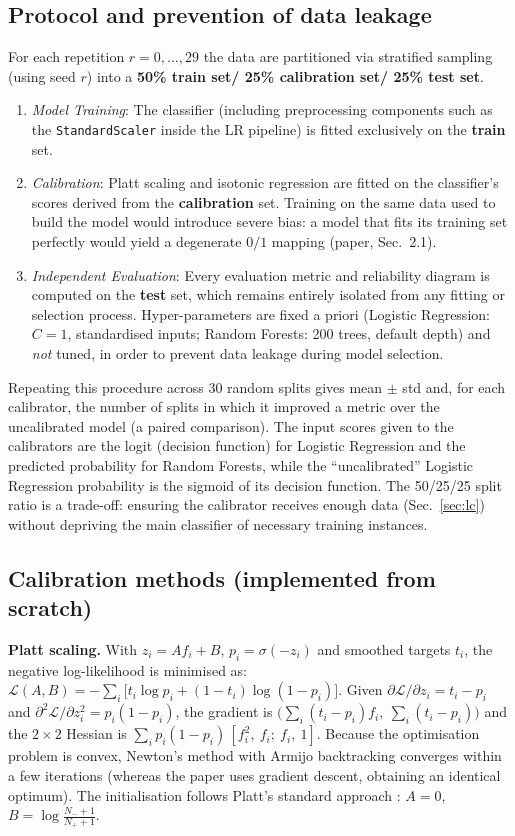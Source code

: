\documentclass[11pt,a4paper]{article}
\begin{document}
\subsection{Protocol and prevention of data leakage}
For each repetition $r=0,\dots,29$ the data are partitioned via stratified sampling (using seed $r$) into a \textbf{50\% train set/ 25\% calibration set/  25\% test set}.
\begin{enumerate}\setlength\itemsep{0pt}
\item \textit{Model Training}: The classifier (including preprocessing components such as the \texttt{StandardScaler} inside the LR pipeline) is fitted exclusively on the \textbf{train} set.
\item \textit{Calibration}: Platt scaling and isotonic regression are fitted on the classifier's scores derived from the \textbf{calibration} set. Training on the same data used to build the model would introduce severe bias: a model that fits its training set perfectly would yield a degenerate $0/1$ mapping (paper, Sec.~2.1).
\item \textit{Independent Evaluation}: Every evaluation metric and reliability diagram is computed on the \textbf{test} set, which remains entirely isolated from any fitting or selection process. Hyper-parameters are fixed a priori (Logistic Regression: $C{=}1$, standardised inputs; Random Forests: 200 trees, default depth) and \emph{not} tuned, in order to prevent data leakage during model selection.
\end{enumerate}
Repeating this procedure across 30 random splits gives mean $\pm$ std and, for each calibrator, the number of splits in which it improved a metric over the uncalibrated model (a paired comparison). The input scores given to the calibrators are the logit (decision function) for Logistic Regression and the predicted probability for Random Forests, while the ``uncalibrated'' Logistic Regression probability is the sigmoid of its decision function. The 50/25/25 split ratio is a trade-off: ensuring the calibrator receives enough data (Sec.~\ref{sec:lc}) without depriving the main classifier of necessary training instances.

\subsection{Calibration methods (implemented from scratch)}
\textbf{Platt scaling.} With $z_i=Af_i+B$, $p_i=\sigma(-z_i)$ and smoothed targets $t_i$, the negative log-likelihood is minimised as:
$\mathcal L(A,B)=-\sum_i \big[t_i\log p_i+(1-t_i)\log(1-p_i)\big]$.
Given $\partial\mathcal L/\partial z_i = t_i-p_i$ and $\partial^2\mathcal L/\partial z_i^2=p_i(1-p_i)$, the gradient is $\big(\sum_i (t_i-p_i)f_i,\ \sum_i (t_i-p_i)\big)$ and the $2\times2$ Hessian is $\sum_i p_i(1-p_i)\,[f_i^2,\ f_i;\ f_i,\ 1]$. Because the optimisation problem is convex, Newton's method with Armijo backtracking converges within a few iterations (whereas the paper uses gradient descent, obtaining an identical optimum). The initialisation follows Platt's standard approach \cite{platt99}: $A=0$, $B=\log\frac{N_-+1}{N_++1}$.
\end{document}
